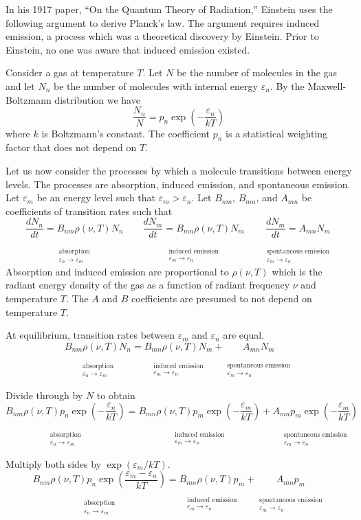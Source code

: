 \documentclass[12pt]{article}
\newcommand\BNM{B_{nm}} %
\newcommand\BMN{B_{mn}} %
\newcommand\AMN{A_{mn}} %
\newcommand\RHO{\rho(\nu,T)}
\newcommand\ABSORPTION{\substack{\phantom{0}\\ \text{absorption}\\ \varepsilon_n\rightarrow\varepsilon_m}}
\newcommand\INDUCED{\substack{\phantom{0}\\ \text{induced emission}\\ \varepsilon_m\rightarrow\varepsilon_n}}
\newcommand\SPONTANEOUS{\substack{\phantom{0}\\ \text{spontaneous emission}\\ \varepsilon_m\rightarrow\varepsilon_n}}
\begin{document}
\noindent
In his 1917 paper, ``On the Quantum Theory of Radiation,''
Einstein uses the following argument to derive Planck's law.
The argument requires induced emission, a process which was a theoretical discovery by Einstein.
Prior to Einstein, no one was aware that induced emission existed.

\bigskip
\noindent
Consider a gas at temperature $T$.
Let $N$ be the number of molecules in the gas
and let $N_n$ be the number of molecules with internal energy $\varepsilon_n$.
By the Maxwell-Boltzmann distribution we have
\begin{equation*}
\frac{N_n}{N}=p_n\exp\left(-\frac{\varepsilon_n}{kT}\right)
\end{equation*}
where $k$ is Boltzmann's constant.
The coefficient $p_n$ is a statistical weighting factor that does not depend on $T$.

\bigskip
\noindent
Let us now consider the processes by which a molecule transitions between energy levels.
The processes are absorption, induced emission, and spontaneous emission.
Let $\varepsilon_m$ be an energy level such that $\varepsilon_m>\varepsilon_n$.
Let $\BNM$, $\BMN$, and $\AMN$ be coefficients of transition rates such that
\begin{equation*}
\underset{\ABSORPTION}{\frac{dN_n}{dt}=\BNM\RHO N_n}
\qquad
\underset{\INDUCED}{\frac{dN_m}{dt}=\BMN\RHO N_m}
\qquad
\underset{\SPONTANEOUS}{\frac{dN_m}{dt}=\AMN N_m}
\end{equation*}
Absorption and induced emission are proportional to $\RHO$
which is the radiant energy density of the gas
as a function of radiant frequency $\nu$ and temperature $T$.
The $A$ and $B$ coefficients are presumed to not depend on temperature $T$.

\bigskip
\noindent
At equilibrium, transition rates between $\varepsilon_m$ and $\varepsilon_n$ are equal.
\begin{equation*}
\underset{\ABSORPTION}{\BNM\RHO N_n}
=\underset{\INDUCED}{\BMN\RHO N_m}
+\underset{\SPONTANEOUS}{\AMN N_m}
\end{equation*}

\noindent
Divide through by $N$ to obtain
\begin{equation*}
\underset{\ABSORPTION}{\BNM\RHO p_n\exp\left(-\frac{\varepsilon_n}{kT}\right)}
=\underset{\INDUCED}{\BMN\RHO p_m\exp\left(-\frac{\varepsilon_m}{kT}\right)}
+\underset{\SPONTANEOUS}{\AMN p_m\exp\left(-\frac{\varepsilon_m}{kT}\right)}
\end{equation*}

\noindent
Multiply both sides by $\exp(\varepsilon_m/kT)$.
\begin{equation*}
\underset{\ABSORPTION}{\BNM\RHO p_n\exp\left(\frac{\varepsilon_m-\varepsilon_n}{kT}\right)}
=\underset{\INDUCED}{\BMN\RHO p_m}
+\underset{\SPONTANEOUS}{\AMN p_m}
\end{equation*}
\end{document}
